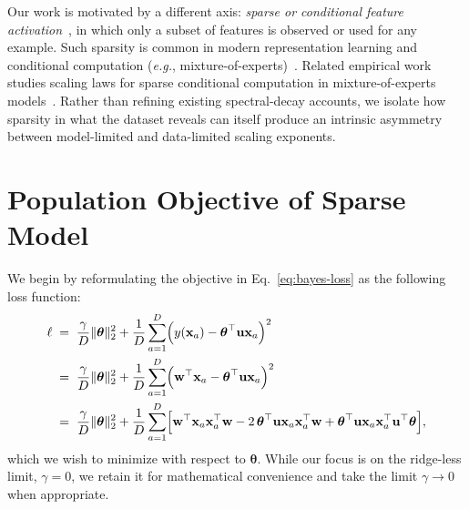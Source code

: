 \documentclass[11pt]{article}
\theoremstyle{plain}
\theoremstyle{definition}
\theoremstyle{remark}
\newcommand{\JSCheck}[1]{#1}
\begin{document}
Our work is motivated by a different axis: \emph{sparse or conditional feature activation}~\citep{Glorot2011DeepSparseRectifier,Olshausen1996SparseCodingNature}, in which only a subset of features is observed or used for any example. Such sparsity is common in modern representation learning and conditional computation (\textit{e.g.}, mixture-of-experts)~\citep{Shazeer2017MoE}. \JSCheck{Related empirical work studies scaling laws for sparse conditional computation
in mixture-of-experts models~\citep{ludziejewski2024finegrainedmoe,abnar2025parameters}.} Rather than refining existing spectral-decay accounts, we isolate how sparsity in what the dataset reveals can itself produce an intrinsic asymmetry between model-limited and data-limited scaling exponents.


\section{\JSCheck{Population Objective of Sparse Model}}\label{appendix:computation}


We begin by reformulating the objective in Eq.~\eqref{eq:bayes-loss} as the following loss function:
\begin{equation}
\begin{split}
    \ell \;&=\; \frac{\gamma}{D} \|\boldsymbol{\theta}\|_2^2 
    + \frac{1}{D} \sum_{a=1}^D \Bigl(y(\mathbf{x}_a) - \boldsymbol{\theta}^\top \mathbf{u} \mathbf{x}_a\Bigr)^2 \\
    &=\; \frac{\gamma}{D} \|\boldsymbol{\theta}\|_2^2 
    + \frac{1}{D} \sum_{a=1}^D \Bigl(\mathbf{w}^\top \mathbf{x}_a - \boldsymbol{\theta}^\top \mathbf{u} \mathbf{x}_a\Bigr)^2 \\
    &=\; \frac{\gamma}{D} \|\boldsymbol{\theta}\|_2^2 
    + \frac{1}{D} \sum_{a=1}^D \Bigl[
        \mathbf{w}^\top \mathbf{x}_a \mathbf{x}_a^\top \mathbf{w}
        - 2\, \boldsymbol{\theta}^\top \mathbf{u} \mathbf{x}_a \mathbf{x}_a^\top \mathbf{w}
        + \boldsymbol{\theta}^\top \mathbf{u} \mathbf{x}_a \mathbf{x}_a^\top \mathbf{u}^\top \boldsymbol{\theta}
    \Bigr], 
\end{split}
\label{eq:lossEquation}
\end{equation}
which we wish to minimize with respect to $\boldsymbol{\theta}$. While our focus is on the ridge-less limit, $\gamma=0$, we retain it for mathematical convenience and take the limit $\gamma \to 0$ when appropriate.
\end{document}

